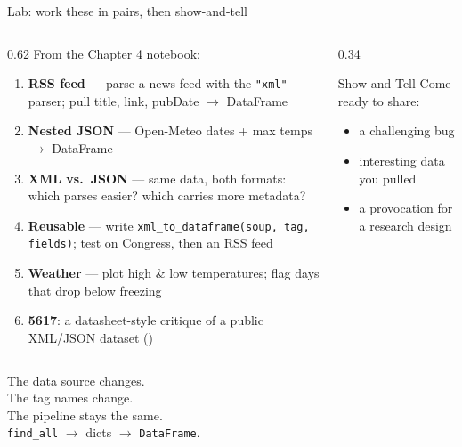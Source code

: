 \documentclass[9pt,aspectratio=169]{beamer}
\begin{document}
\begin{frame}{Lab: work these in pairs, then show-and-tell}
    \begin{columns}[T]
        \begin{column}{0.62\textwidth}
            From the Chapter 4 notebook:
            \begin{enumerate}\small
                \item \textbf{RSS feed} --- parse a news feed with the \texttt{"xml"} parser; pull title, link, pubDate $\rightarrow$ DataFrame
                \item \textbf{Nested JSON} --- Open-Meteo dates + max temps $\rightarrow$ DataFrame
                \item \textbf{XML vs.\ JSON} --- same data, both formats: which parses easier? which carries more metadata?
                \item \textbf{Reusable} --- write \texttt{xml\_to\_dataframe(soup, tag, fields)}; test on Congress, then an RSS feed
                \item \textbf{Weather} --- plot high \& low temperatures; flag days that drop below freezing
                \item[6.] \textcolor{tab-purple}{\textbf{5617}}: a datasheet-style critique of a public XML/JSON dataset (\textcite{gebru2021datasheets})
            \end{enumerate}
        \end{column}
        \begin{column}{0.34\textwidth}
            \begin{block}{Show-and-Tell}
                \footnotesize Come ready to share:
                \begin{itemize}\footnotesize
                    \item a challenging bug
                    \item interesting data you pulled
                    \item a provocation for a research design
                \end{itemize}
            \end{block}
        \end{column}
    \end{columns}
\end{frame}

\begin{frame}[standout]
    The data source changes.\\
    The tag names change.\\
    The pipeline stays the same.\\[1em]
    {\large \texttt{find\_all} $\rightarrow$ dicts $\rightarrow$ \texttt{DataFrame}.}
\end{frame}
\end{document}
